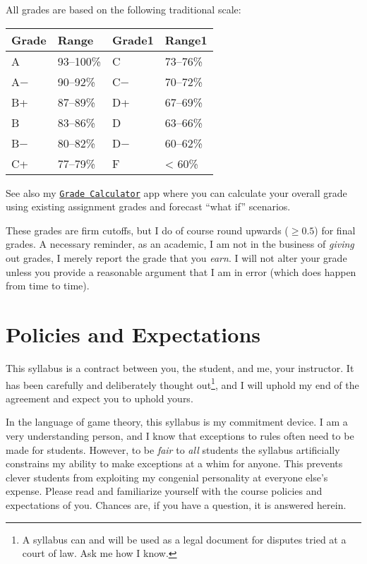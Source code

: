 \documentclass{article}
\begin{document}
All grades are based on the following traditional scale:

\begin{center}

\begin{tabular}{llll}
\toprule
Grade & Range & Grade1 & Range1\\
\midrule
A & 93–100\% & C & 73–76\%\\
A− & 90–92\% & C− & 70–72\%\\
B+ & 87–89\% & D+ & 67–69\%\\
B & 83–86\% & D & 63–66\%\\
B− & 80–82\% & D− & 60–62\%\\
\addlinespace
C+ & 77–79\% & F & < 60\%\\
\bottomrule
\end{tabular}
\end{center}

See also my
\href{https://ryansafner.shinyapps.io/452_grade_calculator/}{
\texttt{Grade\ Calculator}} app where you can calculate your overall
grade using existing assignment grades and forecast ``what if''
scenarios.

These grades are firm cutoffs, but I do of course round upwards
(\(\geq 0.5\)) for final grades. A necessary reminder, as an academic, I
am not in the business of \emph{giving} out grades, I merely report the
grade that you \emph{earn}. I will not alter your grade unless you
provide a reasonable argument that I am in error (which does happen from
time to time).

\hypertarget{policies-and-expectations}{%
\section*{Policies and Expectations}\label{policies-and-expectations}}

This syllabus is a contract between you, the student, and me, your
instructor. It has been carefully and deliberately thought out\footnote{A
  syllabus can and will be used as a legal document for disputes tried
  at a court of law. Ask me how I know.}, and I will uphold my end of
the agreement and expect you to uphold yours.

In the language of game theory, this syllabus is my commitment device. I
am a very understanding person, and I know that exceptions to rules
often need to be made for students. However, to be \emph{fair} to
\emph{all} students the syllabus artificially constrains my ability to
make exceptions at a whim for anyone. This prevents clever students from
exploiting my congenial personality at everyone else's expense. Please
read and familiarize yourself with the course policies and expectations
of you. Chances are, if you have a question, it is answered herein.
\end{document}
